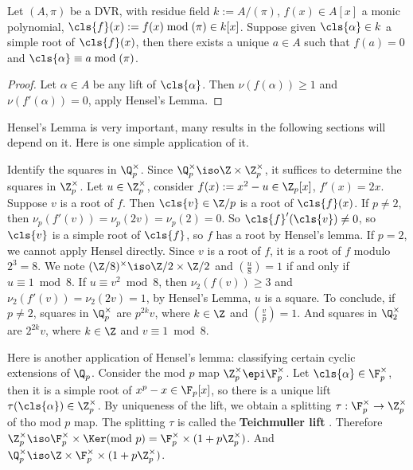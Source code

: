 \documentclass[11pt]{amsart}
\begin{document}
\begin{cor}
    Let $(A, \pi)$ be a DVR, with residue field $k := A/(\pi)$, $f(x) \in A[x]$
    a monic polynomial, $\cls{f}(x) := f(x) \bmod{(\pi)} \in k[x]$.  Suppose
    given $\cls{\alpha} \in k$ a simple root of $\cls{f}(x)$, then there exists
    a unique $a \in A$ such that $f(a) = 0$ and $\cls{\alpha} \equiv a
    \bmod{(\pi)}$.
\end{cor}

\begin{proof}
    Let $\alpha \in A$ be any lift of $\cls{\alpha}$.  Then $\nu(f(\alpha)) \geq
    1$ and $\nu(f'(\alpha)) = 0$, apply Hensel's Lemma.
\end{proof}

Hensel's Lemma is very important, many results in the following sections will
depend on it.  Here is one simple application of it.

\begin{example}
    Identify the squares in $\Q_p^{\times}$. Since $\Q_p^{\times} \iso \Z \times
    \Z_p^{\times}$, it suffices to determine the squares in $\Z_p^{\times}$.
    Let $u \in \Z_p^{\times}$, consider $f(x) := x^2 - u \in \Z_p[x]$, $f'(x) =
    2x$.  Suppose $v$ is a root of $f$.  Then $\cls{v} \in \Z/p$ is a root of
    $\cls{f}(x)$.  If $p \neq 2$, then $\nu_p(f'(v)) = \nu_p(2v) = \nu_p(2) =
    0$.  So $\cls{f}'(\cls{v}) \neq 0$, so $\cls{v}$ is a simple root of
    $\cls{f}$, so $f$ has a root by Hensel's lemma.  If $p = 2$, we cannot apply
    Hensel directly.  Since $v$ is a root of $f$, it is a root of $f$ modulo
    $2^3 = 8$.  We note $(\Z/8)^{\times} \iso \Z/2 \times \Z/2$ and
    $\genfrac(){}{1}{u}{8} = 1$ if and only if $u \equiv 1 \bmod{8}$.  If $u
    \equiv v^2 \bmod{8}$, then $\nu_2(f(v)) \geq 3$ and $\nu_2(f'(v)) =
    \nu_2(2v) = 1$, by Hensel's Lemma, $u$ is a square.  To conclude, if $p \neq
    2$, squares in $\Q_p^{\times}$ are $p^{2k} v$, where $k \in \Z$ and
    $\genfrac(){}{1}{v}{p} = 1$.  And squares in $\Q_2^{\times}$ are $2^{2k} v$,
    where $k \in \Z$ and $v \equiv 1 \bmod{8}$.
\end{example}

\medskip

Here is another application of Hensel's lemma: classifying certain cyclic
extensions of $\Q_p$.
Consider the mod $p$ map $\Z_p^{\times} \epi \F_p^{\times}$.  Let
$\cls{\alpha} \in \F_p^{\times}$, then it is a simple root of $x^{p} - x \in
\F_p[x]$, so there is a unique lift $\tau(\cls{\alpha}) \in \Z_p^{\times}$.  By
uniqueness of the lift, we obtain a splitting $\tau : \F_p^{\times} \to
\Z_p^{\times}$ of tho mod $p$ map.  The splitting $\tau$ is called the {\bf
    Teichmuller lift} .  Therefore $\Z_p^{\times} \iso
\F_p^{\times} \times \Ker (\text{mod } p) = \F_p^{\times} \times (1 +
p\Z_p^{\times})$.  And $\Q_p^{\times} \iso \Z \times \F_p^{\times} \times (1 +
p\Z_p^{\times})$.
\end{document}
